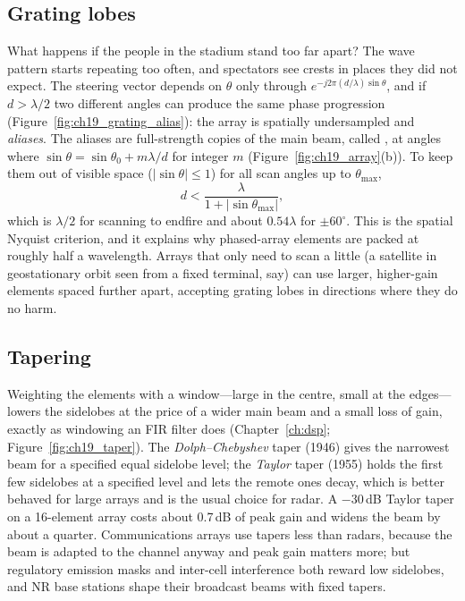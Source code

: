 \subsection{Grating lobes}

What happens if the people in the stadium stand too far apart? The wave pattern starts repeating
too often, and spectators see crests in places they did not expect. The steering vector depends on
$\theta$ only through $e^{-j2\pi(d/\lambda)\sin\theta}$, and if $d>\lambda/2$ two different angles
can produce the same phase progression (Figure~\ref{fig:ch19_grating_alias}): the array is spatially
undersampled and \emph{aliases}. The aliases are full-strength copies of the main beam, called
, at angles where $\sin\theta=\sin\theta_0+m\lambda/d$ for integer $m$
(Figure~\ref{fig:ch19_array}(b)). To keep them out of visible space ($|\sin\theta|\le1$) for all scan
angles up to $\theta_{\max}$,
\begin{equation}
d<\frac{\lambda}{1+|\sin\theta_{\max}|},
\end{equation}
which is $\lambda/2$ for scanning to endfire and about $0.54\lambda$ for $\pm60^\circ$. This is the
spatial Nyquist criterion, and it explains why phased-array elements are packed at roughly half a
wavelength. Arrays that only need to scan a little (a satellite in geostationary orbit seen from a
fixed terminal, say) can use larger, higher-gain elements spaced further apart, accepting grating
lobes in directions where they do no harm.


\subsection{Tapering}

Weighting the elements with a window---large in the centre, small at the edges---lowers the
sidelobes at the price of a wider main beam and a small loss of gain, exactly as windowing an FIR
filter does (Chapter~\ref{ch:dsp}; Figure~\ref{fig:ch19_taper}). The \emph{Dolph--Chebyshev} taper
(1946) gives the narrowest beam for a specified equal sidelobe level; the \emph{Taylor} taper (1955)
holds the first few sidelobes at a specified level and lets the remote ones decay, which is better
behaved for large arrays and is the usual choice for radar. A $-30$\,dB Taylor taper on a
16-element array costs about 0.7\,dB of peak gain and widens the beam by about a quarter.
Communications arrays use tapers less than radars, because the beam is adapted to the channel
anyway and peak gain matters more; but regulatory emission masks and inter-cell interference both
reward low sidelobes, and NR base stations shape their broadcast beams with fixed tapers.

